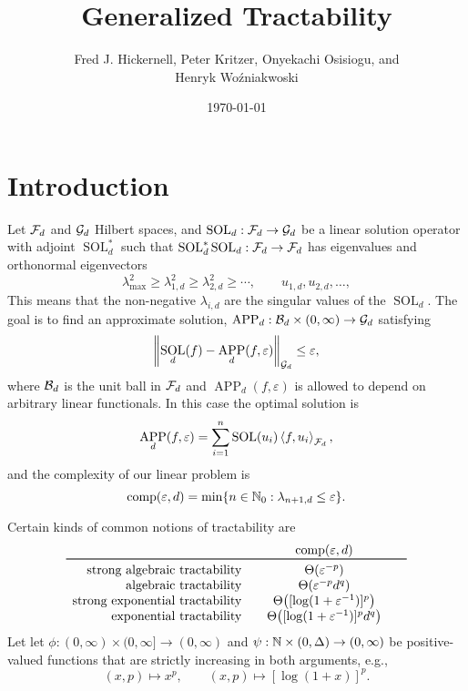 \documentclass{article}
\title{Generalized Tractability}
\author{Fred J. Hickernell, Peter Kritzer, Onyekachi Osisiogu, and \\ Henryk Wo\'zniakwoski}
\date{\today}
\DeclareMathOperator{\SOL}{SOL}
\DeclareMathOperator{\APP}{APP}
\theoremstyle{definition}
\begin{document}
\maketitle

\section{Introduction}

Let $\mathcal{F}_d$ and $\mathcal{G}_d$ Hilbert spaces, and $\SOL_d : \cf_d \to \cg_d$ be a linear solution operator with adjoint $\SOL_d^*$ such that $\SOL_d^*\SOL_d : \cf_d \to \cf_d$ has eigenvalues and orthonormal eigenvectors  
\[
\lambda_{\max}^2 \ge \lambda_{1,d}^2 \ge \lambda_{2,d}^2 \ge \cdots, \qquad u_{1,d}, u_{2,d}, \ldots, 
\]
This means that the non-negative $\lambda_{i,d}$ are the singular values of the $\SOL_d$. The goal is to find an approximate solution, $\APP_d:\cb_d \times (0,\infty) \to \cg_d$ satisfying 
\[
\norm[\cg_d]{\SOL_d(f) - \APP_d(f,\varepsilon)} \le \varepsilon,
\]
where $\mathcal{B}_d$ is the unit ball in $\mathcal{F}_d$ and $\APP_d(f,\varepsilon)$ is allowed to depend on arbitrary linear functionals.  In this case the optimal solution is 
\[
\APP_d(f,\varepsilon) = \sum_{i=1}^n \SOL(u_i) \ip[\cf_d]{f}{u_i},
\]
and the complexity of our linear problem is
\[
\operatorname{comp}(\varepsilon, d) = \min \{n \in \mathbb{N}_{0} : \lambda_{n+1, d} \le \varepsilon\}.
\]

Certain kinds of common notions of tractability are 
\begin{equation*}
    \begin{array}{r@{\qquad}c@{\qquad}c}
    & \comp(\varepsilon, d)\\
    \toprule
    \text{strong algebraic tractability} & \Theta(\varepsilon^{-p})\\
    \text{ algebraic tractability} & \Theta(\varepsilon^{-p}d^{q})\\
    \text{strong exponential tractability} &  \Theta\bigl([\log(1 + \varepsilon^{-1})]^p\bigr)\\
    \text{ exponential tractability} & \Theta\bigl([\log(1 + \varepsilon^{-1})]^p  d^{q}\bigr)
    \end{array}
\end{equation*}
Let let $\phi : (0,\infty) \times (0,\infty] \to (0,\infty)$ and $\psi : \mathbb{N}  \times (0,\Delta) \to (0,\infty)$ be positive-valued functions that are strictly increasing in both arguments, e.g., 
\[
(x,p) \mapsto x^{p}, \qquad (x,p) \mapsto [\log(1+x)]^p.
\]
\end{document}
